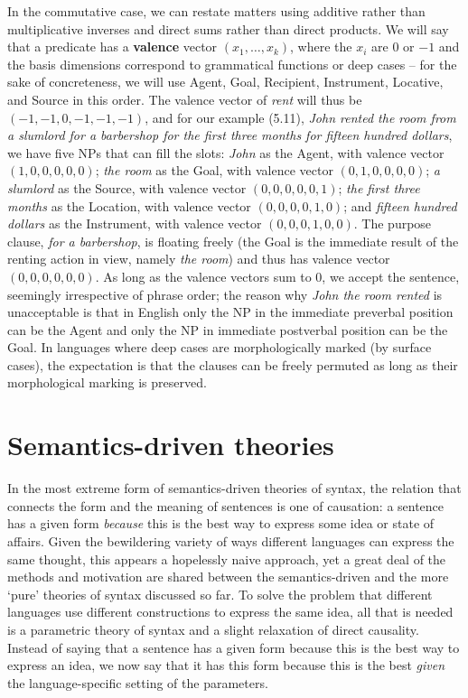 In the commutative case, we can restate matters using additive rather than
multiplicative inverses and direct sums rather than direct products. We will
say that a predicate has a {\bf valence} vector $(x_1,\ldots,x_k)$, where the
$x_i$ are $0$ or $-1$ and the basis dimensions correspond to grammatical
 functions or deep cases -- for the sake of
concreteness, we will use Agent, Goal, Recipient, Instrument, Locative, and
Source in this order. The valence vector of {\it rent} will thus be
$(-1,-1,0,-1,-1,-1)$, and for our example (5.11), {\it John rented the room
  from a slumlord for a barbershop for the first three months for fifteen
  hundred dollars}, we have five NPs that can fill the slots: {\it John} as
the Agent, with valence vector $(1,0,0,0,0,0)$; {\it the room} as the Goal,
with valence vector $(0,1,0,0,0,0)$; {\it a slumlord} as the Source, with
valence vector $(0,0,0,0,0,1)$; {\it the first three months} as the Location,
with valence vector $(0,0,0,0,1,0)$; and {\it fifteen hundred dollars} as the
Instrument, with valence vector $(0,0,0,1,0,0)$. The purpose clause, {\it for
  a barbershop}, is floating freely (the Goal is the immediate result of the
renting action in view, namely {\it the room}) and thus has valence vector
$(0,0,0,0,0,0)$.  As long as the valence vectors sum to 0, we accept the
sentence, seemingly irrespective of phrase order; the reason why {\it *John
  the room rented} is unacceptable is that in English only the NP in the
immediate preverbal position can be the Agent and only the NP in immediate
postverbal position can be the Goal. In languages where deep cases are
morphologically marked (by surface cases), the expectation is that the clauses
can be freely permuted as long as their morphological marking is preserved.



\section{Semantics-driven theories}

In the most extreme form of semantics-driven theories of syntax, the relation
that connects the form and the meaning of sentences is one of causation: a
sentence has a given form {\it because} this is the best way to express some
idea or state of affairs. Given the bewildering variety of ways different
languages can express the same thought, this appears a hopelessly naive
approach, yet a great deal of the methods and motivation are shared between
the semantics-driven and the more `pure' theories of syntax discussed so far.
To solve the problem that different languages use different constructions to
express the same idea, all that is needed is a parametric theory of syntax and
a slight relaxation of direct causality. Instead of saying that a sentence has
a given form because this is the best way to express an idea, we now say that
it has this form because this is the best {\it given} the language-specific
setting of the parameters.

